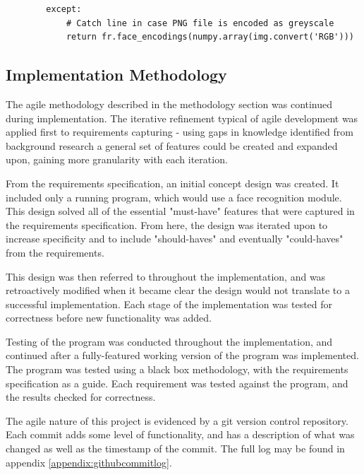 \documentclass[12pt]{article}
\begin{document}
\begin{lstlisting}
        except:
            # Catch line in case PNG file is encoded as greyscale
            return fr.face_encodings(numpy.array(img.convert('RGB')))
\end{lstlisting}

\subsection{Implementation Methodology}
The agile methodology described in the methodology section was continued during implementation. The iterative refinement typical of agile development was applied first to requirements capturing - using gaps in knowledge identified from background research a general set of features could be created and expanded upon, gaining more granularity with each iteration. 

From the requirements specification, an initial concept design was created. It included only a running program, which would use a face recognition module. This design solved all of the essential "must-have" features that were captured in the requirements specification. From here, the design was iterated upon to increase specificity and to include "should-haves" and eventually "could-haves" from the requirements.

This design was then referred to throughout the implementation, and was retroactively modified when it became clear the design would not translate to a successful implementation. Each stage of the implementation was tested for correctness before new functionality was added.

Testing of the program was conducted throughout the implementation, and continued after a fully-featured working version of the program was implemented. The program was tested using a black box methodology, with the requirements specification as a guide. Each requirement was tested against the program, and the results checked for correctness.

The agile nature of this project is evidenced by a git version control repository. Each commit adds some level of functionality, and has a description of what was changed as well as the timestamp of the commit. The full log may be found in appendix \ref{appendix:githubcommitlog}.
\end{document}
